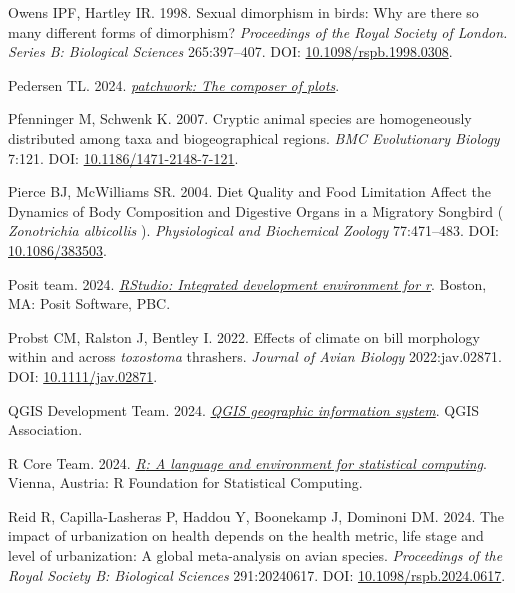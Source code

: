 \documentclass[10pt,a4paper]{article}
\newlength{\cslhangindent}
\newenvironment{CSLReferences}[2] %
 {\begin{list}{}{%
  \setlength{\itemindent}{0pt}
  \setlength{\leftmargin}{0pt}
  \setlength{\parsep}{0pt}
  \ifodd #1
   \setlength{\leftmargin}{\cslhangindent}
   \setlength{\itemindent}{-1\cslhangindent}
  \fi
  \setlength{\itemsep}{#2\baselineskip}}}
 {\end{list}}
\begin{document}
\begin{CSLReferences}{1}{0}
Owens IPF, Hartley IR. 1998. Sexual dimorphism in birds: Why are there so many different forms of dimorphism? \emph{Proceedings of the Royal Society of London. Series B: Biological Sciences} 265:397--407. DOI: \href{https://doi.org/10.1098/rspb.1998.0308}{10.1098/rspb.1998.0308}.

Pedersen TL. 2024. \emph{\href{https://CRAN.R-project.org/package=patchwork}{{patchwork}: The composer of plots}}.

Pfenninger M, Schwenk K. 2007. Cryptic animal species are homogeneously distributed among taxa and biogeographical regions. \emph{BMC Evolutionary Biology} 7:121. DOI: \href{https://doi.org/10.1186/1471-2148-7-121}{10.1186/1471-2148-7-121}.

Pierce BJ, McWilliams SR. 2004. Diet {Quality} and {Food} {Limitation} {Affect} the {Dynamics} of {Body} {Composition} and {Digestive} {Organs} in a {Migratory} {Songbird} ( \emph{{Zonotrichia} albicollis} ). \emph{Physiological and Biochemical Zoology} 77:471--483. DOI: \href{https://doi.org/10.1086/383503}{10.1086/383503}.

Posit team. 2024. \emph{\href{http://www.posit.co/}{{RStudio}: Integrated development environment for r}}. Boston, MA: Posit Software, PBC.

Probst CM, Ralston J, Bentley I. 2022. Effects of climate on bill morphology within and across \emph{toxostoma} thrashers. \emph{Journal of Avian Biology} 2022:jav.02871. DOI: \href{https://doi.org/10.1111/jav.02871}{10.1111/jav.02871}.

QGIS Development Team. 2024. \emph{\href{https://www.qgis.org}{QGIS geographic information system}}. QGIS Association.

R Core Team. 2024. \emph{\href{https://www.R-project.org/}{{R}: A language and environment for statistical computing}}. Vienna, Austria: R Foundation for Statistical Computing.

Reid R, Capilla-Lasheras P, Haddou Y, Boonekamp J, Dominoni DM. 2024. The impact of urbanization on health depends on the health metric, life stage and level of urbanization: A global meta-analysis on avian species. \emph{Proceedings of the Royal Society B: Biological Sciences} 291:20240617. DOI: \href{https://doi.org/10.1098/rspb.2024.0617}{10.1098/rspb.2024.0617}.


\end{CSLReferences}
\end{document}
